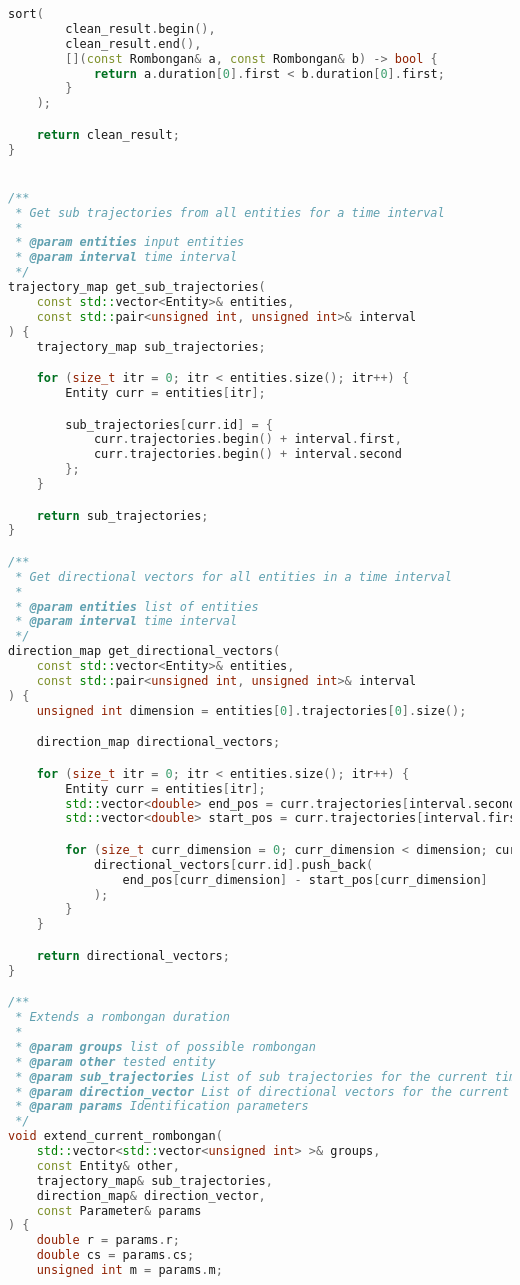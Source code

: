 \begin{lstlisting}[language=C++, caption=Implementasi modul \texttt{rombongan.cpp}, label={lamp:module-rombongan}]
    sort(
        clean_result.begin(),
        clean_result.end(),
        [](const Rombongan& a, const Rombongan& b) -> bool {
            return a.duration[0].first < b.duration[0].first;
        }
    );

    return clean_result;
}


/**
 * Get sub trajectories from all entities for a time interval
 * 
 * @param entities input entities
 * @param interval time interval
 */
trajectory_map get_sub_trajectories(
    const std::vector<Entity>& entities,
    const std::pair<unsigned int, unsigned int>& interval
) {
    trajectory_map sub_trajectories;

    for (size_t itr = 0; itr < entities.size(); itr++) {
        Entity curr = entities[itr];

        sub_trajectories[curr.id] = {
            curr.trajectories.begin() + interval.first,
            curr.trajectories.begin() + interval.second
        };
    }

    return sub_trajectories;
}

/**
 * Get directional vectors for all entities in a time interval
 * 
 * @param entities list of entities
 * @param interval time interval
 */
direction_map get_directional_vectors(
    const std::vector<Entity>& entities,
    const std::pair<unsigned int, unsigned int>& interval
) {
    unsigned int dimension = entities[0].trajectories[0].size();

    direction_map directional_vectors;

    for (size_t itr = 0; itr < entities.size(); itr++) {
        Entity curr = entities[itr];
        std::vector<double> end_pos = curr.trajectories[interval.second - 1];
        std::vector<double> start_pos = curr.trajectories[interval.first];

        for (size_t curr_dimension = 0; curr_dimension < dimension; curr_dimension++) {
            directional_vectors[curr.id].push_back(
                end_pos[curr_dimension] - start_pos[curr_dimension]
            );
        }
    }

    return directional_vectors;
}

/**
 * Extends a rombongan duration
 * 
 * @param groups list of possible rombongan
 * @param other tested entity
 * @param sub_trajectories List of sub trajectories for the current time interval
 * @param direction_vector List of directional vectors for the current time interval
 * @param params Identification parameters
 */
void extend_current_rombongan(
    std::vector<std::vector<unsigned int> >& groups,
    const Entity& other,
    trajectory_map& sub_trajectories,
    direction_map& direction_vector,
    const Parameter& params
) {
    double r = params.r;
    double cs = params.cs;
    unsigned int m = params.m;


\end{lstlisting}
